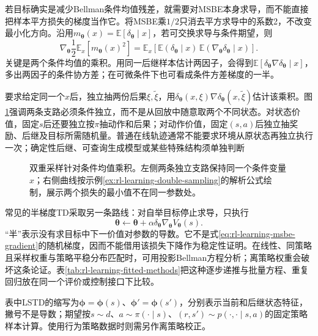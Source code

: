 若目标确实是减少Bellman条件均值残差，就需要对MSBE本身求导，而不能直接把样本平方损失的梯度当作它。将MSBE乘$1/2$只消去平方求导中的系数2，不改变最小化方向。沿用$m_{\bm\theta}(x)=\mathbb E[\delta_{\bm\theta}\mid x]$，若可交换求导与条件期望，则
\begin{equation}
  \nabla_{\bm{\theta}}\frac12\mathbb E_x[m_{\bm{\theta}}(x)^2]
    =\mathbb E_x\!\left[
        \mathbb E(\delta_{\bm{\theta}}\mid x)\,
        \mathbb E(\nabla_{\bm{\theta}}\delta_{\bm{\theta}}\mid x)
      \right].
  \label{eq:rl-learning-msbe-gradient}
\end{equation}
关键是两个条件均值的乘积。用同一后继样本估计两因子，会得到$\mathbb E[\delta_{\bm{\theta}}\nabla\delta_{\bm{\theta}}\mid x]$，多出两因子的条件协方差；在可微条件下也可看成条件方差梯度的一半。

要求给定同一个$x$后，独立抽两份后果$\xi,\widetilde\xi$，用$\delta_{\bm{\theta}}(x,\xi)\nabla\delta_{\bm{\theta}}(x,\widetilde\xi)$估计该乘积。图\ref{fig:rl-learning-double-sampling}强调两条支路必须条件独立，而不是从回放中随意取两个不同状态。对状态价值，固定$s$后还要独立按$\pi$抽动作和后果；对动作价值，固定$(s,a)$后独立抽奖励、后继及目标所需随机量。普通在线轨迹通常不能要求环境从原状态再独立执行一次；确定性后继、可查询生成模型或某些特殊结构须单独判断

\begin{figure}[t]
  \centering
  
  \caption{双重采样针对条件均值乘积。左侧两条独立支路保持同一个条件变量$x$；右侧曲线按示例\ref{ex:rl-learning-double-sampling}的解析公式绘制，展示两个损失的最小值不在同一参数处。}
  \label{fig:rl-learning-double-sampling}
\end{figure}

常见的半梯度TD采取另一条路线：对自举目标停止求导，只执行
\[
  \bm{\theta}\leftarrow\bm{\theta}
       +\alpha\delta_{\bm{\theta}}
                    \nabla_{\bm{\theta}}V_{\bm{\theta}}(s).
\]
“半”表示没有求目标中下一价值对参数的导数。它不是式\eqref{eq:rl-learning-msbe-gradient}的随机梯度，因而不能借用该损失下降作为稳定性证明。在线性、同策略且采样权重与策略平稳分布匹配时，可用投影Bellman方程分析；离策略权重会破坏这条论证。表\ref{tab:rl-learning-fitted-methods}把这种逐步递推与批量方程、重复回归放在同一个评价或控制接口下比较。

表中LSTD的缩写为$\bm\phi=\bm\phi(s)$、$\bm\phi'=\bm\phi(s')$，分别表示当前和后继状态特征，撇号不是导数；期望按$s\sim d$、$a\sim\pi(\cdot\mid s)$、$(r,s')\sim p(\cdot,\cdot\mid s,a)$的固定策略样本计算。使用行为策略数据时则需另作离策略校正。

